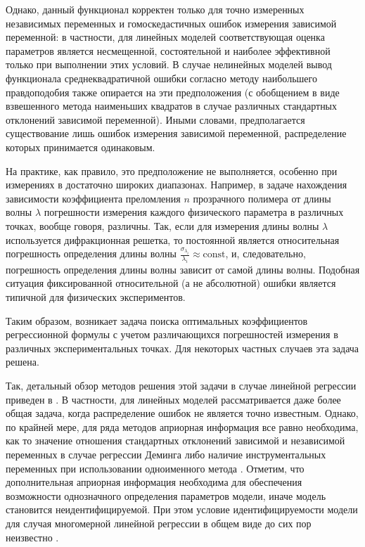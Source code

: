 \documentclass[tikz,10pt,a4paper]{article}
\begin{document}
Однако, данный функционал корректен только для точно измеренных независимых
переменных и гомоскедастичных ошибок измерения зависимой переменной:
в частности, для линейных моделей соответствующая оценка параметров является
несмещенной, состоятельной и наиболее эффективной только при выполнении этих
условий. В случае нелинейных моделей вывод функционала среднеквадратичной
ошибки согласно методу наибольшего правдоподобия также опирается на
эти предположения (с обобщением в виде взвешенного метода наименьших
квадратов в случае различных стандартных отклонений зависимой
переменной).
Иными словами, предполагается существование лишь ошибок измерения зависимой
переменной, распределение которых принимается одинаковым.

На практике, как правило, это предположение не выполняется,
особенно при измерениях в достаточно широких диапазонах.
Например, в задаче нахождения зависимости коэффициента преломления $n$ прозрачного
полимера от длины волны $\lambda$ погрешности измерения каждого физического
параметра в различных точках, вообще говоря, различны\cite{Rudoy15MonteCarlo}.
Так, если для измерения длины волны $\lambda$ используется дифракционная
решетка, то постоянной является относительная погрешность определения длины волны
$\frac{\sigma_{\lambda_i}}{\lambda_i} \approx \text{const}$, и, следовательно,
погрешность определения длины волны зависит от самой длины волны. Подобная ситуация
фиксированной относительной (а не абсолютной) ошибки является типичной для
физических экспериментов.

Таким образом, возникает задача поиска оптимальных коэффициентов регрессионной
формулы с учетом различающихся погрешностей измерения в различных экспериментальных точках.
Для некоторых частных случаев эта задача решена.

Так, детальный обзор методов решения этой задачи
в случае линейной регрессии приведен в \cite{gillard2006historical}.
В частности, для линейных моделей рассматривается даже более общая задача,
когда распределение ошибок не является точно известным.
Однако, по крайней мере, для ряда методов априорная информация все
равно необходима, как то значение отношения стандартных отклонений
зависимой и независимой переменных
в случае регрессии Деминга \cite{Deming1943Statistical}
либо наличие инструментальных переменных
при использовании одноименного метода \cite{Bowden1990Instrumental}.
Отметим, что дополнительная априорная информация необходима
для обеспечения возможности однозначного определения параметров
модели, иначе модель становится неидентифицируемой. При этом
условие идентифицируемости модели для случая многомерной
линейной регрессии в общем виде до сих пор неизвестно
\cite{Bekker1986Comment}.
\end{document}
